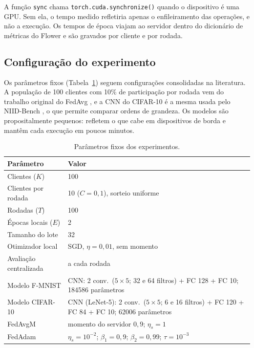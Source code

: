 A função \texttt{sync} chama \texttt{torch.cuda.synchronize()} quando o dispositivo é uma GPU. Sem ela, o tempo medido refletiria apenas o enfileiramento das operações, e não a execução. Os tempos de época viajam ao servidor dentro do dicionário de métricas do Flower e são gravados por cliente e por rodada.

\subsection{Configuração do experimento}

Os parâmetros fixos (Tabela~\ref{tab:fixos}) seguem configurações consolidadas na literatura. A população de 100 clientes com 10\% de participação por rodada vem do trabalho original do FedAvg \citep{mcmahan2017fedavg}, e a CNN do CIFAR-10 é a mesma usada pelo NIID-Bench \citep{li2022niidbench}, o que permite comparar ordens de grandeza. Os modelos são propositalmente pequenos: refletem o que cabe em dispositivos de borda e mantêm cada execução em poucos minutos.

\begin{table}[ht]
    \centering\small
    \caption{Parâmetros fixos dos experimentos.}
    \label{tab:fixos}
    \begin{tabular}{@{}p{3.1cm}p{4.7cm}@{}}
        \toprule
        Parâmetro & Valor \\
        \midrule
        Clientes ($K$) & 100 \\
        Clientes por rodada & 10 ($C = 0{,}1$), sorteio uniforme \\
        Rodadas ($T$) & 100 \\
        Épocas locais ($E$) & 2 \\
        Tamanho do lote & 32 \\
        Otimizador local & SGD, $\eta = 0{,}01$, sem momento \\
        Avaliação centralizada & a cada rodada \\
        Modelo F-MNIST & CNN: 2 conv.\ ($5\times5$; 32 e 64 filtros) + FC 128 + FC 10; \num{184586} parâmetros \\
        Modelo CIFAR-10 & CNN (LeNet-5): 2 conv.\ ($5\times5$; 6 e 16 filtros) + FC 120 + FC 84 + FC 10; \num{62006} parâmetros \\
        FedAvgM & momento do servidor $0{,}9$; $\eta_s = 1$ \\
        FedAdam & $\eta_s = 10^{-2}$; $\beta_1 = 0{,}9$; $\beta_2 = 0{,}99$; $\tau = 10^{-3}$ \\
        \bottomrule
    \end{tabular}
\end{table}

